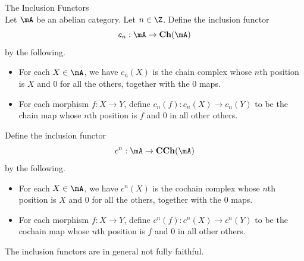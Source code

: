 \documentclass[a4paper]{article}
\begin{document}
\begin{defn}{The Inclusion Functors}{}\\
Let $\mA$ be an abelian category. Let $n\in\Z$. Define the inclusion functor $$c_n:\bold{\mA}\to\bold{Ch}(\mA)$$ by the following. 
\begin{itemize}
\item For each $X\in\mA$, we have $c_n(X)$ is the chain complex whose $n$th position is $X$ and $0$ for all the others, together with the $0$ maps. 
\item For each morphism $f:X\to Y$, define $c_n(f):c_n(X)\to c_n(Y)$ to be the chain map whose $n$th position is $f$ and $0$ in all other others. 
\end{itemize}
Define the inclusion functor $$c^n:\bold{\mA}\to\bold{CCh}(\mA)$$ by the following. 
\begin{itemize}
\item For each $X\in\mA$, we have $c^n(X)$ is the cochain complex whose $n$th position is $X$ and $0$ for all the others, together with the $0$ maps. 
\item For each morphism $f:X\to Y$, define $c^n(f):c^n(X)\to c^n(Y)$ to be the cochain map whose $n$th position is $f$ and $0$ in all other others. 
\end{itemize}
\end{defn}

The inclusion functors are in general not fully faithful. 
\end{document}

